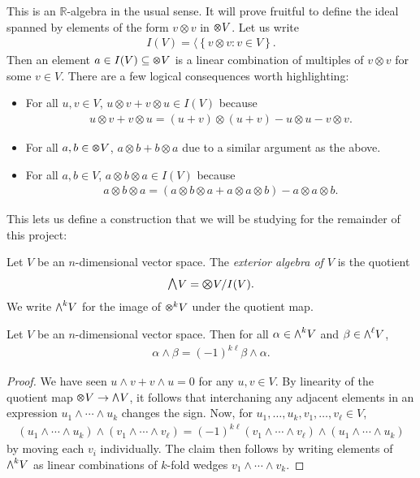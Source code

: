 \documentclass{article}
\begin{document}
This is an $\mathbb{R}$-algebra in the usual sense. It will prove fruitful to define the ideal spanned by elements of the form $v\otimes v$ in $\tensor{}{V}$. Let us write
\begin{align*}
  I(V) = \langle\left\lbrace{v\otimes v : v \in V}\right\rbrace.
\end{align*}
Then an element $a\in I(V)\subseteq \tensor{}{V}$ is a linear combination
of multiples of $v\otimes v$ for some $v\in V$. There are a few
logical consequences worth highlighting:
\begin{itemize}
  \item For all $u,v\in V$, $u\otimes v + v \otimes u \in I(V)$
    because
    \begin{align*}
      u\otimes v + v \otimes u = (u+v)\otimes(u+v)-u\otimes u-v\otimes v.
    \end{align*}
  \item For all $a,b\in\tensor{}{V}$, $a\otimes b+b\otimes a$ due to
    a similar argument as the above. 
  \item For all $a,b\in V$, $a\otimes b\otimes a\in I(V)$ because
    \begin{align*}
      a\otimes b\otimes a = (a\otimes b\otimes a + a \otimes a \otimes b) - a\otimes a\otimes b.
    \end{align*}
\end{itemize}

This lets us define a construction that we will be studying for the remainder
of this project:

\begin{definition}
  Let $V$ be an $n$-dimensional vector space. The \emph{exterior algebra of
  $V$} is the quotient
  \begin{align*}
    \exterior{}{V} = \tensor{}{V}/I(V).
  \end{align*}
  We write $\exterior{k}{V}$ for the image of $\tensor{k}{V}$ under the quotient
  map.
\end{definition}

\begin{lemma}
  Let $V$ be an $n$-dimensional vector space.
  Then for all $\alpha\in\exterior{k}{V}$ and $\beta\in\exterior{\ell}{V}$,
  \begin{align*}
    \alpha\wedge\beta = (-1)^{k\ell}\beta\wedge\alpha.
  \end{align*}
  \begin{proof}
    We have seen $u\wedge v + v\wedge u = 0$ for any $u,v\in V$.
    By linearity of the quotient map $\tensor{}{V}\to\exterior{}{V}$,
    it follows that interchaning any adjacent elements in an expression
    $u_1\wedge\cdots\wedge u_k$ changes the sign. Now,
    for $u_1,\ldots,u_k,v_1,\ldots,v_\ell\in V$,
    \begin{align*}
      (u_1\wedge\cdots\wedge u_k)\wedge(v_1\wedge\cdots\wedge v_\ell)
      = (-1)^{k\ell}(v_1\wedge\cdots\wedge v_\ell)\wedge(u_1\wedge\cdots\wedge u_k)
    \end{align*}
    by moving each $v_i$ individually. The claim then follows
    by writing elements of $\exterior{k}{V}$ as linear combinations
    of $k$-fold wedges $v_1\wedge\cdots\wedge v_k$.
  \end{proof}
\end{lemma}
\end{document}
